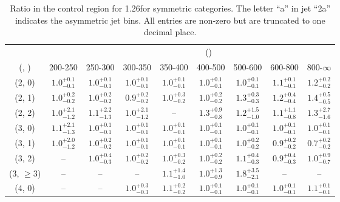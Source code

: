 \begin{table}[h!]
\tiny
\centering
\caption{Ratio in the \mj control region for 1.26\ifb for symmetric categories. The letter ``a'' in jet \eg ``2a''  indicates the asymmetric jet bins. All entries are non-zero but are truncated to one decimal place.\label{tab:ratiosep_ewk_mu_sym}}
\begin{tabular}
{ccccccccc}
	\hline\hline
&	& \multicolumn{8}{c}{\scalht (\gev)} \\ 
	 (\njet,  \nb) & 200-250 & 250-300 & 300-350 & 350-400 & 400-500 & 500-600 & 600-800 & 800-$\infty$ \\ [0.8ex] 
\hline
	(2, 0) & $1.0^{+ 0.1 }_{- 0.1 }$ & $1.0^{+ 0.1 }_{- 0.1 }$ & $1.0^{+ 0.1 }_{- 0.1 }$ & $1.0^{+ 0.1 }_{- 0.1 }$ & $1.0^{+ 0.1 }_{- 0.1 }$ & $1.0^{+ 0.1 }_{- 0.1 }$ & $1.1^{+ 0.1 }_{- 0.1 }$ & $1.2^{+ 0.2 }_{- 0.2 }$ \\[0.5ex] 
	(2, 1) & $1.0^{+ 0.2 }_{- 0.2 }$ & $1.0^{+ 0.2 }_{- 0.2 }$ & $0.9^{+ 0.2 }_{- 0.2 }$ & $1.0^{+ 0.3 }_{- 0.2 }$ & $1.0^{+ 0.2 }_{- 0.2 }$ & $1.3^{+ 0.3 }_{- 0.3 }$ & $1.2^{+ 0.4 }_{- 0.4 }$ & $1.4^{+ 0.5 }_{- 0.5 }$ \\[0.5ex] 
	(2, 2) & $1.0^{+ 2.1 }_{- 1.2 }$ & $1.1^{+ 2.2 }_{- 1.3 }$ & $1.0^{+ 2.1 }_{- 1.2 }$ & -- & $1.3^{+ 0.9 }_{- 0.8 }$ & $1.2^{+ 1.5 }_{- 1.0 }$ & $1.1^{+ 1.1 }_{- 0.8 }$ & $1.3^{+ 2.7 }_{- 1.6 }$ \\[0.5ex] 
	(3, 0) & $1.1^{+ 2.1 }_{- 1.3 }$ & $1.0^{+ 0.1 }_{- 0.1 }$ & $1.0^{+ 0.1 }_{- 0.1 }$ & $1.0^{+ 0.1 }_{- 0.1 }$ & $1.0^{+ 0.1 }_{- 0.1 }$ & $1.0^{+ 0.1 }_{- 0.1 }$ & $1.0^{+ 0.1 }_{- 0.1 }$ & $1.0^{+ 0.1 }_{- 0.1 }$ \\[0.5ex] 
	(3, 1) & $1.0^{+ 2.0 }_{- 1.2 }$ & $1.0^{+ 0.2 }_{- 0.2 }$ & $1.0^{+ 0.1 }_{- 0.1 }$ & $1.0^{+ 0.1 }_{- 0.1 }$ & $1.0^{+ 0.1 }_{- 0.1 }$ & $1.0^{+ 0.2 }_{- 0.2 }$ & $0.9^{+ 0.2 }_{- 0.2 }$ & $0.7^{+ 0.2 }_{- 0.2 }$ \\[0.5ex] 
	(3, 2) & -- & $1.0^{+ 0.4 }_{- 0.3 }$ & $1.0^{+ 0.2 }_{- 0.2 }$ & $1.0^{+ 0.3 }_{- 0.2 }$ & $1.0^{+ 0.2 }_{- 0.2 }$ & $1.1^{+ 0.4 }_{- 0.3 }$ & $0.9^{+ 0.4 }_{- 0.3 }$ & $1.0^{+ 0.9 }_{- 0.7 }$ \\[0.5ex] 
	(3, $\ge3$) & -- & -- & -- & $1.1^{+ 1.4 }_{- 1.0 }$ & $1.0^{+ 1.3 }_{- 0.9 }$ & $1.8^{+ 3.5 }_{- 2.1 }$ & -- & -- \\[0.5ex] 
	(4, 0) & -- & -- & $1.0^{+ 0.3 }_{- 0.3 }$ & $1.1^{+ 0.2 }_{- 0.2 }$ & $1.0^{+ 0.1 }_{- 0.1 }$ & $1.0^{+ 0.1 }_{- 0.1 }$ & $1.0^{+ 0.1 }_{- 0.1 }$ & $1.1^{+ 0.1 }_{- 0.1 }$ \\[0.5ex] 

\end{tabular}
\end{table}
